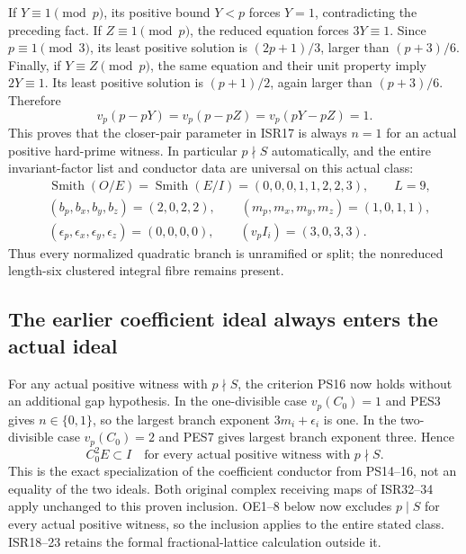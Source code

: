 \documentclass[11pt]{article}
\begin{document}
If $Y\equiv1\pmod p$, its positive bound $Y<p$ forces $Y=1$,
contradicting the preceding fact. If $Z\equiv1\pmod p$, the reduced
equation forces $3Y\equiv1$. Since $p\equiv1\pmod3$, its least
positive solution is $(2p+1)/3$, larger than $(p+3)/6$.
Finally, if $Y\equiv Z\pmod p$, the same equation and their unit
property imply $2Y\equiv1$. Its least positive solution is
$(p+1)/2$, again larger than $(p+3)/6$. Therefore
\begin{equation}
 v_p(p-pY)=v_p(p-pZ)=v_p(pY-pZ)=1.                       \tag{PES6}
\end{equation}
This proves that the closer-pair parameter in ISR17 is always $n=1$
for an actual positive hard-prime witness. In particular $p\nmid S$
automatically, and the entire invariant-factor list and conductor data
are universal on this actual class:
\begin{equation}
 \begin{aligned}
 &\operatorname{Smith}(O/E)=\operatorname{Smith}(E/I)
       =(0,0,0,1,1,2,2,3),\qquad L=9,\\
 &(b_p,b_x,b_y,b_z)=(2,0,2,2),\qquad
 (m_p,m_x,m_y,m_z)=(1,0,1,1),\\
 &(\epsilon_p,\epsilon_x,\epsilon_y,\epsilon_z)=(0,0,0,0),
 \qquad (v_p I_i)=(3,0,3,3).
 \end{aligned}                                         \tag{PES7}
\end{equation}
Thus every normalized quadratic branch is unramified or split; the
nonreduced length-six clustered integral fibre remains present.

\subsection{The earlier coefficient ideal always enters the actual ideal}
For any actual positive witness with $p\nmid S$, the criterion PS16
now holds without an additional gap hypothesis. In the one-divisible
case $v_p(C_0)=1$ and PES3 gives $n\in\{0,1\}$, so the largest
branch exponent $3m_i+\epsilon_i$ is one. In the two-divisible case
$v_p(C_0)=2$ and PES7 gives largest branch exponent three. Hence
\begin{equation}
 C_0^2 E\subset I
 \quad\text{for every actual positive witness with }p\nmid S.
                                                               \tag{PES8}
\end{equation}
This is the exact specialization of the coefficient conductor
from PS14--16, not an equality of the two ideals. Both original
complex receiving maps of ISR32--34 apply unchanged to this proven
inclusion. OE1--8 below now excludes $p\mid S$ for every actual
positive witness, so the inclusion applies to the entire stated class.
ISR18--23 retains the formal fractional-lattice calculation outside it.
\end{document}

